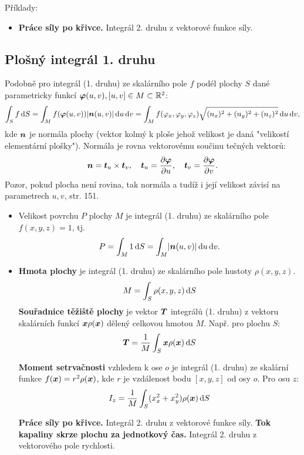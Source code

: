 Příklady:
\begin{itemize}
 \item {\bf Práce síly po křivce.} Integrál 2. druhu z vektorové funkce síly.
\end{itemize}




\subsection{Plošný integrál 1. druhu}

Podobně pro integrál (1. druhu) ze skalárního pole $f$ podél plochy $S$ dané parametricky funkcí
$\mathbf{\boldsymbol{\varphi}}(u,v), [u,v]\in M\subset {\mathbb R}^2$:
\[
   \int_S f \,{\rm d} S = \int_M f(\mathbf{\boldsymbol{\varphi}}(u,v)) \lvert\mathbf{\boldsymbol{n}}(u,v)\rvert \,{\rm d} u\,{\rm d} v=
   \int_M f(\varphi_x,\varphi_y,\varphi_z) \sqrt{ (n_x)^2 + (n_y)^2 + (n_z)^2} \,{\rm d} u\,{\rm d} v,
\]
kde $\mathbf{\boldsymbol{n}}$ je normála plochy (vektor kolmý k ploše jehož velikost je daná "velikostí elementární plošky"). Normála je rovna vektorovému součinu tečných vektorů:
\[
   \mathbf{\boldsymbol{n}}= \mathbf{\boldsymbol{t}}_u \times \mathbf{\boldsymbol{t}}_v,\quad \mathbf{\boldsymbol{t}}_u = \frac{\partial \mathbf{\boldsymbol{\varphi}}}{\partial u},\quad \mathbf{\boldsymbol{t}}_v=\frac{\partial \mathbf{\boldsymbol{\varphi}}}{\partial v}.
\]
Pozor, pokud plocha není rovina, tak normála a tudíž i její velikost závisí na parametrech $u, v$, \cite{CVUT} str. 151.

\begin{itemize}
 \item Velikost povrchu $P$  plochy $M$ je integrál (1. druhu) ze skalárního pole $f(x,y,z)=1$, tj.
\[   
   P=\int_M 1 \,{\rm d} S = \int_M \lvert\mathbf{\boldsymbol{n}}(u,v)\rvert \,{\rm d} u\,{\rm d} v.
\]
\item {\bf Hmota plochy} je integrál (1. druhu) ze skalárního pole hustoty $\rho(x,y,z)$.
\[
        M=\int_S \rho(x,y,z) \,{\rm d} S
\]
{\bf Souřadnice těžiště plochy} je vektor $\mathbf{\boldsymbol{T}}$ integrálů (1. druhu) z vektoru skalárních funkcí 
$ \mathbf{\boldsymbol{x}} \rho( \mathbf{\boldsymbol{x}})$ dělený celkovou hmotou $M$. Např. pro plochu $S$:
\[
        \mathbf{\boldsymbol{T}}=\frac{1}{M}\int_S \mathbf{\boldsymbol{x}}\rho(\mathbf{\boldsymbol{x}}) \,{\rm d} S
\]

{\bf Moment setrvačnosti} vzhledem k ose $o$ je integrál (1. druhu) ze skalární funkce $f(\mathbf{\boldsymbol{x}})=r^2\rho(\mathbf{\boldsymbol{x}})$, 
kde $r$ je vzdálenost bodu $[x,y,z]$ od osy $o$. Pro osu $z$:
\[
    I_z = \frac{1}{M} \int_S (x_x^2 + x_y^2) \rho(\mathbf{\boldsymbol{x}}) \,{\rm d} S
\]

{\bf Práce síly po křivce.} Integrál 2. druhu z vektorové funkce síly.
{\bf Tok kapaliny skrze plochu za jednotkový čas.} Integrál 2. druhu z vektorového pole rychlosti.

\end{itemize}


